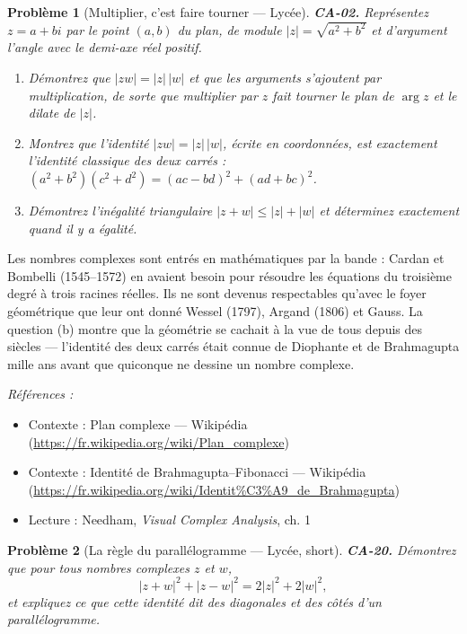 \documentclass[11pt]{article}
\newtheorem{problem}{Problème}
\newenvironment{refs}{\par\small\noindent\emph{Références :}\begin{itemize}\setlength\itemsep{0pt}}{\end{itemize}\normalsize}
\begin{document}
\bigskip

\begin{problem}[{Multiplier, c'est faire tourner --- Lycée}]
\textbf{CA-02.} Représentez $ z = a + bi $ par le point $ (a, b) $ du
plan, de module $ |z| = \sqrt{a^2 + b^2} $ et d'argument l'angle avec le demi-axe réel
positif.
\begin{enumerate}
\item[(a)] Démontrez que $ |zw| = |z|\,|w| $ et que les arguments s'ajoutent par multiplication,
de sorte que multiplier par $ z $ fait tourner le plan de $ \arg z $ et le dilate de $ |z| $.
\item[(b)] Montrez que l'identité $ |zw| = |z|\,|w| $, écrite en coordonnées, est exactement
l'identité classique des deux carrés :
$ (a^2 + b^2)(c^2 + d^2) = (ac - bd)^2 + (ad + bc)^2 $.
\item[(c)] Démontrez l'inégalité triangulaire $ |z + w| \le |z| + |w| $ et déterminez exactement quand
il y a égalité.
\end{enumerate}

\end{problem}

\noindent Les nombres complexes sont entrés en mathématiques par la bande : Cardan et
Bombelli (1545--1572) en avaient besoin pour résoudre les équations du troisième degré à trois
racines réelles. Ils ne sont devenus respectables qu'avec le foyer géométrique que leur ont donné
Wessel (1797), Argand (1806) et Gauss. La question (b) montre que la géométrie se cachait à la vue
de tous depuis des siècles --- l'identité des deux carrés était connue de Diophante et de Brahmagupta
mille ans avant que quiconque ne dessine un nombre complexe.

\begin{refs}
\item Contexte : Plan complexe --- Wikipédia (\url{https://fr.wikipedia.org/wiki/Plan_complexe})
\item Contexte : Identité de Brahmagupta--Fibonacci --- Wikipédia (\url{https://fr.wikipedia.org/wiki/Identit%C3%A9_de_Brahmagupta})
\item Lecture : Needham, \textit{Visual Complex Analysis}, ch. 1
\end{refs}

\bigskip

\begin{problem}[{La règle du parallélogramme --- Lycée, short}]
\textbf{CA-20.} Démontrez que pour tous nombres complexes $ z $ et $ w $,
\[ |z + w|^2 + |z - w|^2 = 2|z|^2 + 2|w|^2, \]
et expliquez ce que cette identité dit des diagonales et des côtés d'un parallélogramme.
\end{problem}
\end{document}
